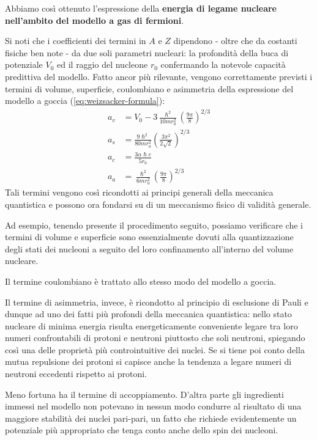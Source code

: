 Abbiamo così ottenuto l’espressione della \textbf{energia di legame nucleare nell’ambito del modello a gas di fermioni}.

Si noti che i coefficienti dei termini in $A$ e $Z $ dipendono - oltre che da costanti fisiche ben note - da due soli parametri nucleari:
la profondità della buca di potenziale $V_{0}$ ed il raggio del nucleone $r_{0}$ confermando la notevole capacità predittiva del modello.
Fatto ancor più rilevante, vengono correttamente previsti i termini di volume, superficie, coulombiano e asimmetria della 
espressione del modello a goccia (\ref{eq:weizsacker-formula}):
\begin{align*}
	a_{v} &= V_{0} - 3 \frac{\hslash^{2}}{10 m r_{0}^{2}} \left( \frac{9\pi}{8} \right)^{2/3} \\
	a_{s} &= \frac{9\hslash^{2}}{80 m r_{0}^{2}} \left(  \frac{3\pi^{2}}{2\sqrt{ 2 }} \right)^{2/3} \\
	a_{c} &= \frac{3 \alpha \hslash c}{5 r_{0}} \\
	a_{a} &= \frac{\hslash^{2}}{6 m r_{0}^{2}} \left(\frac{9\pi}{8} \right)^{2/3}
\end{align*}
Tali termini vengono così ricondotti ai principi generali della meccanica quantistica e possono ora fondarsi su di un meccanismo fisico di validità generale.

Ad esempio, tenendo presente il procedimento seguito, possiamo verificare che i termini di volume e superficie sono essenzialmente dovuti alla quantizzazione degli stati dei nucleoni a seguito del loro confinamento all’interno del volume nucleare.

Il termine coulombiano è trattato allo stesso modo del modello a goccia.

Il termine di asimmetria, invece, è ricondotto al principio di esclusione di Pauli e dunque ad uno dei fatti più profondi della meccanica quantistica: nello stato nucleare di minima energia risulta energeticamente conveniente
legare tra loro numeri confrontabili di protoni e neutroni piuttosto che soli neutroni, spiegando così una delle proprietà più controintuitive dei nuclei.
Se si tiene poi conto della mutua repulsione dei protoni si capisce anche la tendenza a legare numeri di neutroni eccedenti rispetto ai protoni.

Meno fortuna ha il termine di accoppiamento.
D’altra parte gli ingredienti immessi nel modello non potevano in nessun modo condurre al risultato di una maggiore stabilità dei nuclei pari-pari, un fatto che richiede evidentemente un potenziale più appropriato che tenga conto anche dello spin dei nucleoni.

